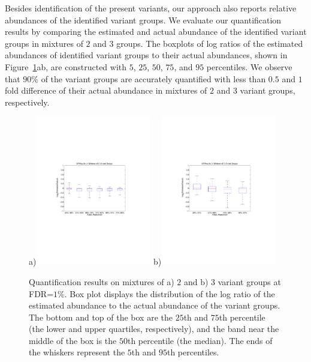 Besides identification of the present variants, our approach also reports relative abundances of the identified variant groups. We evaluate our quantification results by comparing the estimated and actual abundance of the identified variant groups in mixtures of $2$ and $3$ groups. The boxplots of log ratios of the estimated abundances of identified variant groups to their actual abundances, shown in Figure~\ref{fig:SimActualvsEstBoxPlot}ab, are constructed with $5$, $25$, $50$, $75$, and $95$ percentiles. We observe that $90\%$ of the variant groups are accurately quantified with less than $0.5$ and $1$ fold difference of their actual abundance in mixtures of $2$ and $3$ variant groups, respectively.

\begin{figure}[htbp]
\centering %
a)\includegraphics[trim = 30mm 80mm 40mm 80mm,clip, width=0.45\textwidth]{fig/simulation/boxplot_actualvsEst_2variants.pdf}
b)\includegraphics[trim = 30mm 80mm 40mm 80mm,clip, width=0.45\textwidth]{fig/simulation/boxplot_actualvsEst_3variants.pdf}
\caption[Quantification results on mixtures of $2$ and $3$ variant groups]{Quantification results on mixtures of a) $2$ and b) $3$ variant groups at FDR=$1\%$.
Box plot displays the distribution of the log ratio of the estimated abundance to the actual abundance of the variant groups. The bottom and top of the box are the $25$th and $75$th percentile (the lower and upper quartiles, respectively), and the band near the middle of the box is the $50$th percentile (the median). The ends of the whiskers represent the $5$th and $95$th percentiles.}
\label{fig:SimActualvsEstBoxPlot}
\end{figure}
